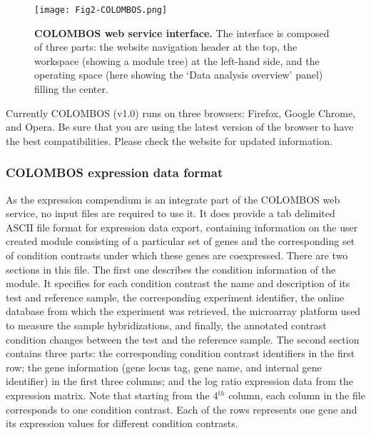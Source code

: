 \begin{figure}[tb]
	\centering
  	\texttt{[image: Fig2-COLOMBOS.png]}
	\caption[COLOMBOS web service interface]{\textbf{COLOMBOS web 
	service interface.} 
	The interface is composed of three parts: the website navigation header at 
	the top, the workspace (showing a module tree) at the left-hand side, and 
	the operating space (here showing the `Data analysis overview' panel) 
	filling the center.}
	\label{fig:colombos}
\end{figure}

Currently COLOMBOS (v1.0) runs on three browsers: Firefox, Google Chrome, and 
Opera. Be sure that you are using the latest version of the browser to have the 
best compatibilities. Please check the website for updated information. 

\subsubsection{COLOMBOS expression data format}\label{sec:dist-format-col}
As the expression compendium is an integrate part of the COLOMBOS web service, 
no input files are required to use it.  
It does provide a tab delimited ASCII file format for expression data export, 
containing information on the user created module consisting of a particular 
set of genes and the corresponding set of condition contrasts under which these 
genes are coexpressed. 
There are two sections in this file. The first one describes the 
condition information of the module. It specifies for each condition contrast 
the name and description of its test and reference sample, the corresponding 
experiment identifier, the online database from which the experiment was 
retrieved, the microarray platform used to measure the sample hybridizations, 
and finally, the annotated contrast condition changes between the test and the 
reference sample. The second section contains three parts: the corresponding 
condition contrast identifiers in the first row; the gene information (gene 
locus tag, gene name, and internal gene identifier) in the first three columns; 
and the log ratio expression data from the expression matrix. Note that 
starting from the 4$^{th}$ column, each column in the file corresponds to one 
condition contrast. Each of the rows represents one gene and its expression 
values for different condition contrasts.


